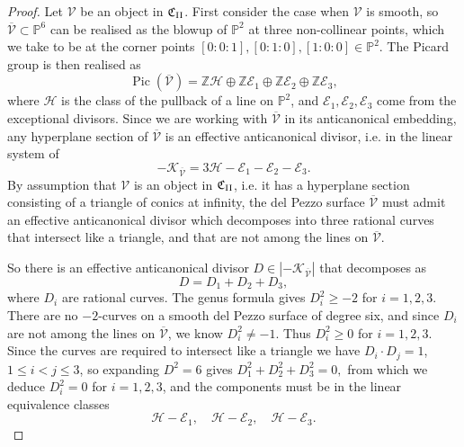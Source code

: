 \documentclass[a4paper,reqno]{amsart}
\numberwithin{equation}{section}
\newcommand{\Z}{\mathbb{Z}}
\newcommand{\p}{\mathbb{P}}
\newcommand{\E}{\mathcal{E}}
\newcommand{\h}{\mathcal{H}}
\newcommand{\Pic}{\operatorname{Pic}}
\numberwithin{equation}{section}
\begin{document}
 
\begin{proof}
    Let $\mathcal{V}$ be an object in $\mathfrak{C}_{\rm{II}}$. 
    First consider the case when $\mathcal{V}$ is smooth, so $\overline{\mathcal{V}}\subset\p^6$ can be realised as the blowup of $\p^2$ at three non-collinear points, which we take to be at the corner points $[0:0:1],[0:1:0],[1:0:0]\in\p^2$.
    The Picard group is then realised as 
    $$\Pic(\overline{\mathcal{V}}) = \Z \h \oplus\Z \E_1\oplus\Z \E_2\oplus\Z \E_3,$$
    where $\mathcal{H}$ is the class of the pullback of a line on $\p^2$, and $\E_1,\E_2,\E_3$ come from the exceptional divisors.
    Since we are working with $\overline{\mathcal{V}}$ in its anticanonical embedding, any hyperplane section of $\overline{\mathcal{V}}$ is an effective anticanonical divisor, i.e. in the linear system of 
    $$ -\mathcal{K}_{\overline{\mathcal{V}}} = 3 \h-\E_1-\E_2-\E_3.$$
    By assumption that $\mathcal{V}$ is an object in $\mathfrak{C}_{\rm{II}}$, i.e. it has a hyperplane section consisting of a triangle of conics at infinity, the del Pezzo surface $\overline{\mathcal{V}}$ must admit an effective anticanonical divisor which decomposes into three rational curves that intersect like a triangle, and that are not among the lines on $\overline{\mathcal{V}}$.
    
    So there is an effective anticanonical divisor $D\in |-\mathcal{K}_{\overline{\mathcal{V}}}|$ that decomposes as 
    $$D = D_1+D_2+D_3,$$
    where $D_i$ are rational curves. 
    The genus formula gives $D_i^2 \geq -2$ for $i=1,2,3$.
        There are no $-2$-curves on a smooth del Pezzo surface of degree six, and since $D_i$ are not among the lines on $\overline{\mathcal{V}}$, we know $D_i^2\neq -1$.
    Thus $D_i^2\geq 0$ for $i=1,2,3$.
    Since the curves are required to intersect like a triangle we have $D_i\cdot D_j=1$, $1\leq i<j\leq 3$,
    so expanding $D^2=6$ gives 
$D_1^2 +D_2^2 +D_3^2=0,$
 from which we deduce $D_i^2=0$ for $i=1,2,3$, and the components must be in the linear equivalence classes
    $$ \h-\E_1,\quad \h-\E_2,\quad\h-\E_3.$$
    

\end{proof}
\end{document}

